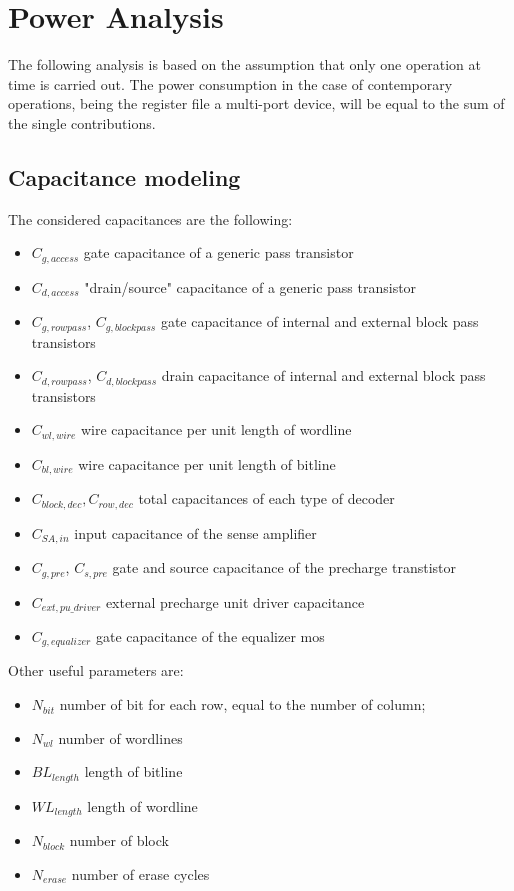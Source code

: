 \chapter{Power Analysis}
\graphicspath{{foto/Chap3/}}

The following analysis is based on the assumption that only one operation at time is carried out. The power consumption in the case of contemporary operations, being the register file a multi-port device, will be equal to the sum of the single contributions.
 
\section{Capacitance modeling}
The considered capacitances are the following:
\begin{itemize}
	\item $C_{g,access}$ gate capacitance of a generic pass transistor
	\item $C_{d,access}$ "drain/source" capacitance of a generic pass transistor
	\item $C_{g,rowpass}$, $C_{g,blockpass}$ gate capacitance of internal and external block pass transistors
	\item $C_{d,rowpass}$, $C_{d,blockpass}$ drain capacitance of internal and external block pass transistors
	\item $C_{wl,wire}$ wire capacitance per unit length of wordline
	\item $C_{bl,wire}$ wire capacitance per unit length of bitline
	\item $C_{block,dec},C_{row,dec}$ total capacitances of each type of decoder
	\item $C_{SA,in}$ input capacitance of the sense amplifier
	\item $C_{g,pre}$, $C_{s,pre}$ gate and source capacitance of the precharge transtistor
	\item $C_{ext,pu\_driver}$ external precharge unit driver capacitance
	\item $C_{g,equalizer}$ gate capacitance of the equalizer mos
\end{itemize}

Other useful parameters are:

\begin{itemize}
	\item $N_{bit}$ number of bit for each row, equal to the number of column; 
	\item $N_{wl}$ number of wordlines
	\item $BL_{length}$ length of bitline 
	\item $WL_{length}$ length of wordline
	\item $N_{block}$ number of block
	\item $N_{erase}$ number of erase cycles
\end{itemize}

